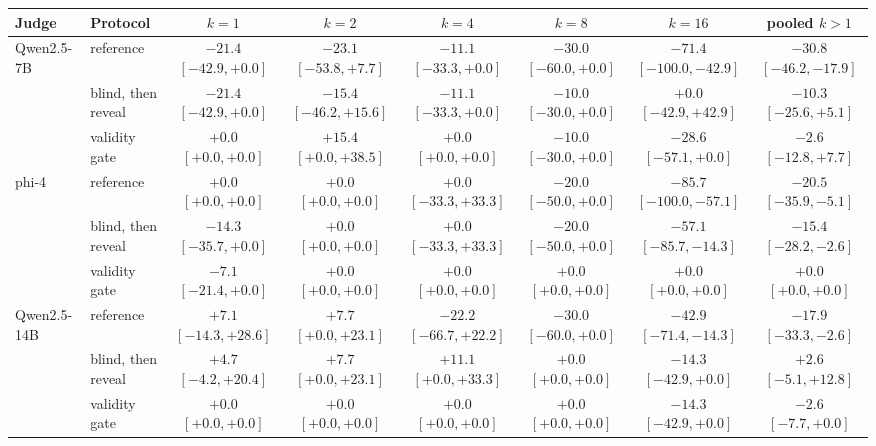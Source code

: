 \begin{tabular}{llcccccc}
\toprule
Judge & Protocol & $k{=}1$ & $k{=}2$ & $k{=}4$ & $k{=}8$ & $k{=}16$ & pooled $k{>}1$ \\
\midrule
Qwen2.5-7B & reference & $-21.4$ {\scriptsize$[-42.9,+0.0]$} & $-23.1$ {\scriptsize$[-53.8,+7.7]$} & $-11.1$ {\scriptsize$[-33.3,+0.0]$} & $-30.0$ {\scriptsize$[-60.0,+0.0]$} & $-71.4$ {\scriptsize$[-100.0,-42.9]$} & $-30.8$ {\scriptsize$[-46.2,-17.9]$} \\
 & blind, then reveal & $-21.4$ {\scriptsize$[-42.9,+0.0]$} & $-15.4$ {\scriptsize$[-46.2,+15.6]$} & $-11.1$ {\scriptsize$[-33.3,+0.0]$} & $-10.0$ {\scriptsize$[-30.0,+0.0]$} & $+0.0$ {\scriptsize$[-42.9,+42.9]$} & $-10.3$ {\scriptsize$[-25.6,+5.1]$} \\
 & validity gate & $+0.0$ {\scriptsize$[+0.0,+0.0]$} & $+15.4$ {\scriptsize$[+0.0,+38.5]$} & $+0.0$ {\scriptsize$[+0.0,+0.0]$} & $-10.0$ {\scriptsize$[-30.0,+0.0]$} & $-28.6$ {\scriptsize$[-57.1,+0.0]$} & $-2.6$ {\scriptsize$[-12.8,+7.7]$} \\
\addlinespace
phi-4 & reference & $+0.0$ {\scriptsize$[+0.0,+0.0]$} & $+0.0$ {\scriptsize$[+0.0,+0.0]$} & $+0.0$ {\scriptsize$[-33.3,+33.3]$} & $-20.0$ {\scriptsize$[-50.0,+0.0]$} & $-85.7$ {\scriptsize$[-100.0,-57.1]$} & $-20.5$ {\scriptsize$[-35.9,-5.1]$} \\
 & blind, then reveal & $-14.3$ {\scriptsize$[-35.7,+0.0]$} & $+0.0$ {\scriptsize$[+0.0,+0.0]$} & $+0.0$ {\scriptsize$[-33.3,+33.3]$} & $-20.0$ {\scriptsize$[-50.0,+0.0]$} & $-57.1$ {\scriptsize$[-85.7,-14.3]$} & $-15.4$ {\scriptsize$[-28.2,-2.6]$} \\
 & validity gate & $-7.1$ {\scriptsize$[-21.4,+0.0]$} & $+0.0$ {\scriptsize$[+0.0,+0.0]$} & $+0.0$ {\scriptsize$[+0.0,+0.0]$} & $+0.0$ {\scriptsize$[+0.0,+0.0]$} & $+0.0$ {\scriptsize$[+0.0,+0.0]$} & $+0.0$ {\scriptsize$[+0.0,+0.0]$} \\
\addlinespace
Qwen2.5-14B & reference & $+7.1$ {\scriptsize$[-14.3,+28.6]$} & $+7.7$ {\scriptsize$[+0.0,+23.1]$} & $-22.2$ {\scriptsize$[-66.7,+22.2]$} & $-30.0$ {\scriptsize$[-60.0,+0.0]$} & $-42.9$ {\scriptsize$[-71.4,-14.3]$} & $-17.9$ {\scriptsize$[-33.3,-2.6]$} \\
 & blind, then reveal & $+4.7$ {\scriptsize$[-4.2,+20.4]$} & $+7.7$ {\scriptsize$[+0.0,+23.1]$} & $+11.1$ {\scriptsize$[+0.0,+33.3]$} & $+0.0$ {\scriptsize$[+0.0,+0.0]$} & $-14.3$ {\scriptsize$[-42.9,+0.0]$} & $+2.6$ {\scriptsize$[-5.1,+12.8]$} \\
 & validity gate & $+0.0$ {\scriptsize$[+0.0,+0.0]$} & $+0.0$ {\scriptsize$[+0.0,+0.0]$} & $+0.0$ {\scriptsize$[+0.0,+0.0]$} & $+0.0$ {\scriptsize$[+0.0,+0.0]$} & $-14.3$ {\scriptsize$[-42.9,+0.0]$} & $-2.6$ {\scriptsize$[-7.7,+0.0]$} \\

\end{tabular}
